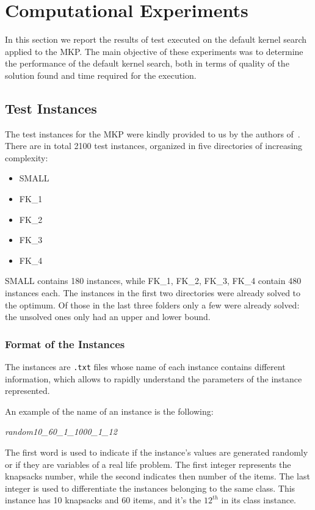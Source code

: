 \chapter{Computational Experiments}
In this section we report the results of test executed on the default kernel search applied to the MKP\@.
The main objective of these experiments was to determine the performance of the default kernel search,
both in terms of quality of the solution found and time required for the execution.


\section{Test Instances}
The test instances for the MKP were kindly provided to us by the authors of~\cite{mkp:2019}.\\
There are in total 2100 test instances, organized in
five directories of increasing complexity:
\begin{itemize}
    \item SMALL
    \item FK\_1
    \item FK\_2
    \item FK\_3
    \item FK\_4
\end{itemize}
SMALL contains 180 instances, while FK\_1, FK\_2, FK\_3, FK\_4 contain 480 instances each.
The instances in the first two directories were already solved to the optimum.
Of those in the last three folders only a few were already solved: the unsolved
ones only had an upper and lower bound.


\subsection{Format of the Instances}
The instances are \texttt{.txt} files whose name of each instance contains different information,
which allows to rapidly understand the parameters of the instance represented.

An example of the name of an instance is the following:
\begin{center}
    \textit{random10\_60\_1\_1000\_1\_12}
\end{center}
The first word is used to indicate if the instance's values are generated randomly or if they are variables of a real
life problem.
The first integer represents the knapsacks number, while the second indicates then number of the items.
The last integer is used to differentiate the instances belonging to the same class.
This instance has 10 knapsacks and 60 items, and it's the \(12^{th}\) in its class instance.

